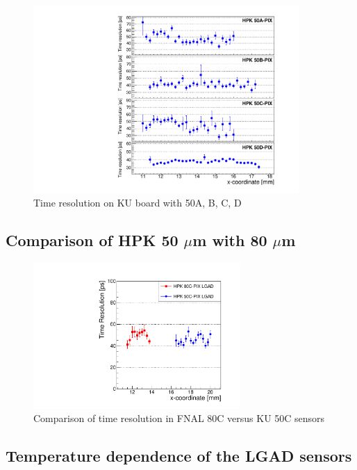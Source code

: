 \documentclass[preprint,1p]{elsarticle}
\begin{document}
\begin{figure}[htbp] 
\centering
\includegraphics[width=0.9\textwidth]{figs/KUBoard_HPK50ABCD/KUBoard_50ABCD_TimeResolution.pdf} 
\caption{Time resolution on KU board with 50A, B, C, D } 
\label{fig:Sensors} 
\end{figure} 




\subsection{Comparison of HPK 50 $\mu$m with 80 $\mu$m}
\label{sec:HPK50vs80}

\begin{figure}[htbp] 
\centering
\includegraphics[width=0.7\textwidth]{figs/FNAL_TimeResolution_vs_X_HPK50CVs80C.pdf} 
\caption{Comparison of time resolution in FNAL 80C versus KU 50C sensors } 
\label{fig:Sensors} 
\end{figure} 


\subsection{Temperature dependence of the LGAD sensors}
\label{sec:temp_dependance}
\end{document}
